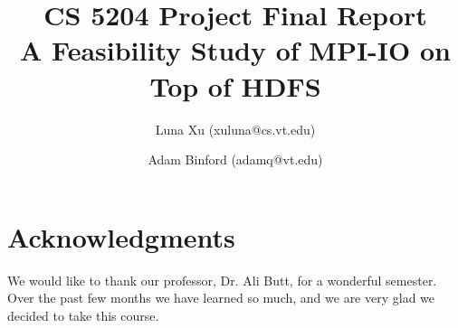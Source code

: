 \documentclass[11pt,titlepage]{article}
\author{Luna Xu (xuluna@cs.vt.edu) \and Adam Binford (adamq@vt.edu)}
\title{CS 5204 Project Final Report \\ A Feasibility Study of MPI-IO on Top of HDFS}
\begin{document}
\maketitle







\section{Acknowledgments}
We would like to thank our professor, Dr. Ali Butt, for a wonderful semester.
Over the past few months we have learned so much, and we are very glad
we decided to take this course.

{}

\end{document}
